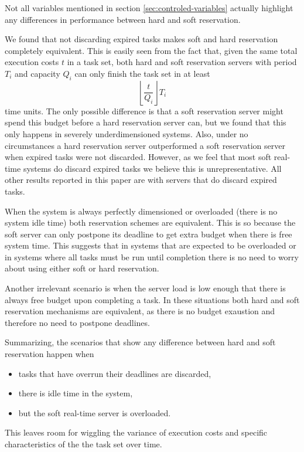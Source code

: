 \documentclass[times, 10pt,twocolumn]{article}
\begin{document}
\label{sec:simulation-results}

Not all variables mentioned in section \ref{sec:controled-variables}
actually highlight any differences in performance between hard and
soft reservation.

\label{sec:disc-expir-tasks}

We found that not discarding expired tasks makes soft and hard
reservation completely equivalent. This is easily seen from the fact
that, given the same total execution costs $t$ in a task set, both
hard and soft reservation servers with period $T_i$ and capacity $Q_i$
can only finish the task set in at least
\[ \left\lfloor\frac{t}{Q_i}\right\rfloor T_i\]
time units. The only possible difference is that a soft reservation
server might spend this budget before a hard reservation server can,
but we found that this only happens in severely underdimensioned
systems. Also, under no circumstances a hard reservation server
outperformed a soft reservation server when expired tasks were not
discarded. However, as we feel that most soft real-time systems do
discard expired tasks we believe this is unrepresentative. All other
results reported in this paper are with servers that do discard
expired tasks.

\label{sec:system-load}

When the system is always perfectly dimensioned or overloaded (there
is no system idle time) both reservation schemes are equivalent. This
is so because the soft server can only postpone its deadline to get
extra budget when there is free system time. This suggests that in
systems that are expected to be overloaded or in systems where all
tasks must be run until completion there is no need to worry about
using either soft or hard reservation. 

\label{sec:server-load}

Another irrelevant scenario is when the server load is low enough that
there is always free budget upon completing a task. In these
situations both hard and soft reservation mechanisms are equivalent,
as there is no budget exaustion and therefore no need to postpone
deadlines.

Summarizing, the scenarios that show any difference between hard and
soft reservation happen when
\begin{itemize}
\item tasks that have overrun their deadlines are discarded,
\item there is idle time in the system,
\item but the soft real-time server is overloaded.
\end{itemize}
This leaves room for wiggling the variance of execution costs and
specific characteristics of the the task set over time.
\end{document}

